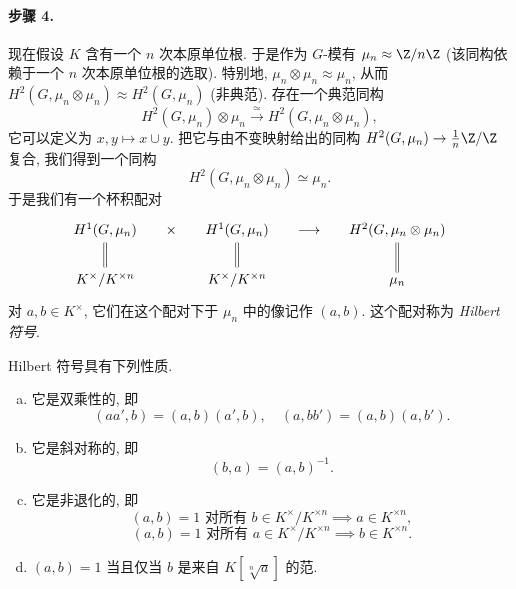 \paragraph*{步骤 4.} 现在假设 $K$ 含有一个 $n$ 次本原单位根. 于是作为 $G$-模有 $\mu_n\approx\Z/n\Z$ (该同构依赖于一个 $n$ 次本原单位根的选取). 特别地, $\mu_n\otimes\mu_n\approx\mu_n$, 从而 $H^2(G,\mu_n\otimes\mu_n)\approx H^2(G,\mu_n)$ (非典范). 存在一个典范同构
\[
 H^2(G,\mu_n)\otimes\mu_n\xrightarrow{\simeq}H^2(G,\mu_n\otimes\mu_n),
\]
它可以定义为 $x,y\mapsto x\cup y$. 把它与由不变映射给出的同构 $H^2(G,\mu_n)\to\tfrac{1}{n}\Z/\Z$ 复合, 我们得到一个同构
\[
 H^2(G,\mu_n\otimes\mu_n)\simeq\mu_n.
\]
于是我们有一个杯积配对
\[
\begin{tikzcd}[column sep=small]
	{H^1(G,\mu_n)} & {\times} & {H^1(G,\mu_n)} & {\longrightarrow} & {H^2(G,\mu_n\otimes\mu_n)} \\
	{K^\times/K^{\times n}} & & {K^\times/K^{\times n}} & & {\mu_n}
	\arrow[equal, no head, from=1-1, to=2-1]
	\arrow[equal, no head, from=1-3, to=2-3]
	\arrow[equal, no head, from=1-5, to=2-5]
\end{tikzcd}
\]
对 $a,b\in K^\times$, 它们在这个配对下于 $\mu_n$ 中的像记作 $(a,b)$. 这个配对称为 \emph{Hilbert 符号}.

\begin{theorem}\label{thm:iii.4.4}
Hilbert 符号具有下列性质.
\begin{enumerate}[(a)]
\item 它是双乘性的, 即
\[
 (aa',b)=(a,b)(a',b),\quad (a,bb')=(a,b)(a,b').
\]
\item 它是斜对称的, 即
\[
 (b,a)=(a,b)^{-1}.
\]
\item 它是非退化的, 即
\[
 (a,b)=1 \text{ 对所有 } b\in K^\times/K^{\times n}\implies a\in K^{\times n},
\]
\[
 (a,b)=1 \text{ 对所有 } a\in K^\times/K^{\times n}\implies b\in K^{\times n}.
\]
\item $(a,b)=1$ 当且仅当 $b$ 是来自 $K[\sqrt[n]{a}]$ 的范.
\end{enumerate}
\end{theorem}

